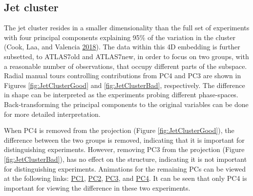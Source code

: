 \hypertarget{jet-cluster}{%
\subsection{Jet cluster}\label{jet-cluster}}

The jet cluster resides in a smaller dimensionality than the full set of
experiments with four principal components explaining 95\% of the
variation in the cluster (Cook, Laa, and Valencia
\protect\hyperlink{ref-cook_dynamical_2018}{2018}). The data within this
4D embedding is further subsetted, to ATLAS7old and ATLAS7new, in order
to focus on two groups, with a reasonable number of observations, that
occupy different parts of the subspace. Radial manual tours controlling
contributions from PC4 and PC3 are shown in Figures
\ref{fig:JetClusterGood} and \ref{fig:JetClusterBad}, respectively. The
difference in shape can be interpreted as the experiments probing
different phase-spaces. Back-transforming the principal components to
the original variables can be done for more detailed interpretation.

When PC4 is removed from the projection (Figure
\ref{fig:JetClusterGood}), the difference between the two groups is
removed, indicating that it is important for distinguishing experiments.
However, removing PC3 from the projection (Figure
\ref{fig:JetClusterBad}), has no effect on the structure, indicating it
is not important for distinguishing experiments. Animations for the
remaining PCs can be viewed at the following links:
\href{https://nspyrison.netlify.com/thesis/jetcluster_manualtour_pc1/}{PC1},
\href{https://nspyrison.netlify.com/thesis/jetcluster_manualtour_pc2/}{PC2},
\href{https://nspyrison.netlify.com/thesis/jetcluster_manualtour_pc3/}{PC3},
and
\href{https://nspyrison.netlify.com/thesis/jetcluster_manualtour_pc4/}{PC4}.
It can be seen that only PC4 is important for viewing the difference in
these two experiments.

